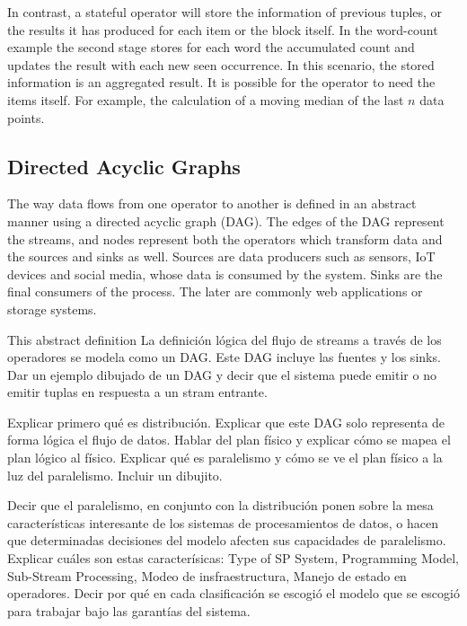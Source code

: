   In contrast, a stateful operator will store the information of previous
  tuples, or the results it has produced for each item or the block itself. In
  the word-count example the second stage stores for each word the accumulated
  count and updates the result with each new seen occurrence. In this scenario,
  the stored information is an aggregated result. It is possible for the
  operator to need the items itself. For example, the calculation of a moving
  median of the last $n$ data points.

  \subsection{Directed Acyclic Graphs}
  The way data flows from one operator to another is defined in an abstract
  manner using a directed acyclic graph (DAG). The edges of the DAG represent
  the streams, and nodes represent both the operators which transform data and
  the sources and sinks as well. Sources are data producers such as sensors,
  IoT devices and social media, whose data is consumed by the system. Sinks are
  the final consumers of the process. The later are commonly web applications
  or storage systems.


  This abstract definition
  La definición lógica del flujo de streams a través de los operadores se
  modela como un DAG. Este DAG incluye las fuentes y los sinks. Dar un ejemplo
  dibujado de un DAG y decir que el sistema puede emitir o no emitir tuplas en
  respuesta a un stram entrante.

  Explicar primero qué es distribución. Explicar que este DAG solo representa
  de forma lógica el flujo de datos. Hablar del plan físico y explicar cómo se
  mapea el plan lógico al físico. Explicar qué es paralelismo y cómo se ve el
  plan físico a la luz del paralelismo. Incluir un dibujito.
  \cite{kamburugamuve2013survey}

  Decir que el paralelismo, en conjunto con la distribución ponen sobre la mesa
  características interesante de los sistemas de procesamientos de datos, o
  hacen que determinadas decisiones del modelo afecten sus capacidades de
  paralelismo. Explicar cuáles son estas caracterísicas: Type of SP System,
  Programming Model, Sub-Stream Processing, Modeo de insfraestructura, Manejo
  de estado en operadores. \cite{R_ger_2019} Decir por qué en cada
  clasificación se escogió el modelo que se escogió para trabajar bajo las
  garantías del sistema.

